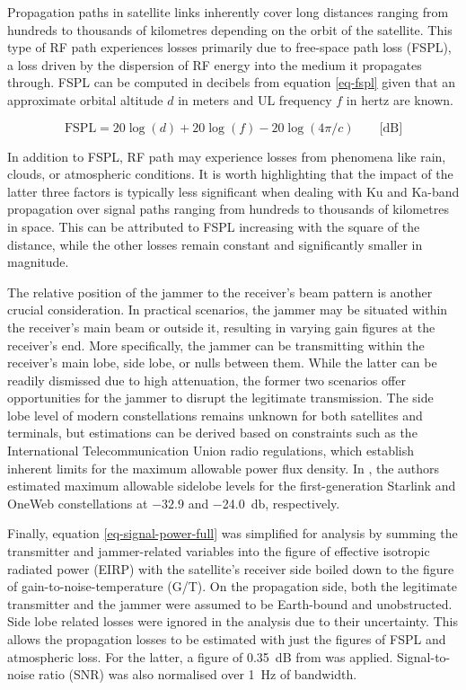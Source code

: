\documentclass[english, 12pt, a4paper, elec, utf8, a-1b, online]{aaltothesis}
\begin{document}
Propagation paths in satellite links inherently cover long distances ranging from hundreds to thousands of kilometres depending on the orbit of the satellite.
This type of RF path experiences losses primarily due to free-space path loss (FSPL), a loss driven by the dispersion of RF energy into the medium it propagates through.
FSPL can be computed in decibels from equation \ref{eq-fspl} given that an approximate orbital altitude $d$ in meters and UL frequency $f$ in hertz are known.

\begin{equation} \label{eq-fspl}
  \mathrm{FSPL} = 20\log(d)+20\log(f)-20\log(4\pi / c) \qquad \text{[dB]}
\end{equation}

In addition to FSPL, RF path may experience losses from phenomena like rain, clouds, or atmospheric conditions.
It is worth highlighting that the impact of the latter three factors is typically less significant when dealing with Ku and Ka-band propagation over signal paths ranging from hundreds to thousands of kilometres in space.
This can be attributed to FSPL increasing with the square of the distance, while the other losses remain constant and significantly smaller in magnitude.

The relative position of the jammer to the receiver's beam pattern is another crucial consideration.
In practical scenarios, the jammer may be situated within the receiver's main beam or outside it, resulting in varying gain figures at the receiver's end. More specifically, the jammer can be transmitting within the receiver's main lobe, side lobe, or nulls between them.
While the latter can be readily dismissed due to high attenuation, the former two scenarios offer opportunities for the jammer to disrupt the legitimate transmission.
The side lobe level of modern constellations remains unknown for both satellites and terminals, but estimations can be derived based on constraints such as the International Telecommunication Union radio regulations, which establish inherent limits for the maximum allowable power flux density.
In \cite{hills2023controlling}, the authors estimated maximum allowable sidelobe levels for the first-generation Starlink and OneWeb constellations at $-32.9$ and \qty{-24.0}{\decibel}, respectively. 

Finally, equation \ref{eq-signal-power-full} was simplified for analysis by summing the transmitter and jammer-related variables into the figure of effective isotropic radiated power (EIRP) with the satellite's receiver side boiled down to the figure of gain-to-noise-temperature (G/T).
On the propagation side, both the legitimate transmitter and the jammer were assumed to be Earth-bound and unobstructed.
Side lobe related losses were ignored in the analysis due to their uncertainty.
This allows the propagation losses to be estimated with just the figures of FSPL and atmospheric loss.
For the latter, a figure of \SI{0.35}{\deci\bel} from \cite{kymeta2019link} was applied. Signal-to-noise ratio (SNR) was also normalised over \SI{1}{\hertz} of bandwidth.
\end{document}
